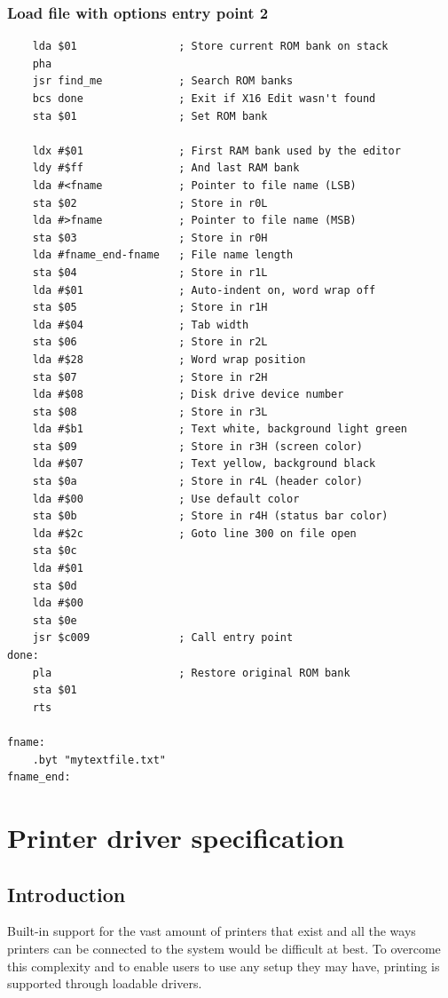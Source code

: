 \documentclass{article}
\begin{document}
    \subsubsection{Load file with options entry point 2}
\begin{verbatim}
    lda $01                ; Store current ROM bank on stack
    pha
    jsr find_me            ; Search ROM banks
    bcs done               ; Exit if X16 Edit wasn't found
    sta $01                ; Set ROM bank
    
    ldx #$01               ; First RAM bank used by the editor
    ldy #$ff               ; And last RAM bank
    lda #<fname            ; Pointer to file name (LSB)
    sta $02                ; Store in r0L
    lda #>fname            ; Pointer to file name (MSB)
    sta $03                ; Store in r0H
    lda #fname_end-fname   ; File name length
    sta $04                ; Store in r1L
    lda #$01               ; Auto-indent on, word wrap off
    sta $05                ; Store in r1H
    lda #$04               ; Tab width
    sta $06                ; Store in r2L
    lda #$28               ; Word wrap position
    sta $07                ; Store in r2H
    lda #$08               ; Disk drive device number
    sta $08                ; Store in r3L
    lda #$b1               ; Text white, background light green
    sta $09                ; Store in r3H (screen color)
    lda #$07               ; Text yellow, background black
    sta $0a                ; Store in r4L (header color)
    lda #$00               ; Use default color
    sta $0b                ; Store in r4H (status bar color)
    lda #$2c               ; Goto line 300 on file open
    sta $0c
    lda #$01
    sta $0d
    lda #$00
    sta $0e
    jsr $c009              ; Call entry point
done:
    pla                    ; Restore original ROM bank
    sta $01
    rts
   
fname:
    .byt "mytextfile.txt"
fname_end:
\end{verbatim}

\newpage
\section{Printer driver specification}

    \subsection{Introduction}

        Built-in support for the vast amount of printers that exist and all the ways printers
        can be connected to the system would be difficult at best. To overcome this complexity
        and to enable users to use any setup they may have, printing is supported through
        loadable drivers.
\end{document}
